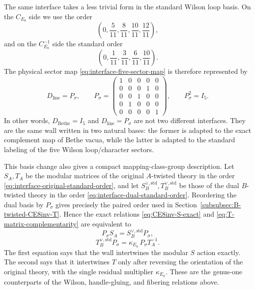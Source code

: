 \documentclass[11pt,a4paper]{article}
\numberwithin{equation}{section}
\begin{document}
The same interface takes a less trivial form in the standard Wilson loop basis.  On the $C_{E_8}$ side we use the order
\begin{equation}
  \left(
  0,\frac5{11},\frac8{11},\frac{10}{11},\frac{12}{11}
  \right),
  \label{eq:interface-original-standard-order}
\end{equation}
and on the $C_{E_8}^{-1}$ side the standard order
\begin{equation}
  \left(
  0,\frac1{11},\frac3{11},\frac6{11},\frac{10}{11}
  \right).
  \label{eq:interface-dual-standard-order}
\end{equation}
The physical sector map \eqref{eq:interface-five-sector-map} is therefore represented by
\begin{equation}
  D_{\mathrm{line}}=P_\sigma,
  \qquad
  P_\sigma=
  \begin{pmatrix}
  1&0&0&0&0\\
  0&0&0&1&0\\
  0&0&1&0&0\\
  0&1&0&0&0\\
  0&0&0&0&1
  \end{pmatrix},
  \qquad
  P_\sigma^2=I_5.
  \label{eq:interface-line-permutation}
\end{equation}
In other words, $D_{\mathrm{Bethe}}=I_5$ and $D_{\mathrm{line}}=P_\sigma$ are not two different interfaces.  They are the same wall written in two natural bases: the former is adapted to the exact complement map of Bethe vacua, while the latter is adapted to the standard labeling of the five Wilson loop/character sectors.

This basis change also gives a compact mapping-class-group description.  Let $S_A,T_A$ be the modular matrices of the original $A$-twisted theory in the order \eqref{eq:interface-original-standard-order}, and let $S_B^{\vee,\mathrm{std}},T_B^{\vee,\mathrm{std}}$ be those of the dual $B$-twisted theory in the order \eqref{eq:interface-dual-standard-order}.  Reordering the dual basis by $P_\sigma$ gives precisely the paired order used in Section~\ref{subsubsec:B-twisted-CE8inv-T}.  Hence the exact relations \eqref{eq:CE8inv-S-exact} and \eqref{eq:T-matrix-complementarity} are equivalent to
\begin{equation}
  P_\sigma S_A
  =S_B^{\vee,\mathrm{std}}P_\sigma,
  \label{eq:interface-S-intertwiner}
\end{equation}
\begin{equation}
  T_B^{\vee,\mathrm{std}}P_\sigma
  =\kappa_{E_8}\,
  P_\sigma T_A^{-1}.
  \label{eq:interface-T-intertwiner}
\end{equation}
The first equation says that the wall intertwines the modular $S$ action exactly.  The second says that it intertwines $T$ only after reversing the orientation of the original theory, with the single residual multiplier $\kappa_{E_8}$.  These are the genus-one counterparts of the Wilson, handle-gluing, and fibering relations above.
\end{document}
